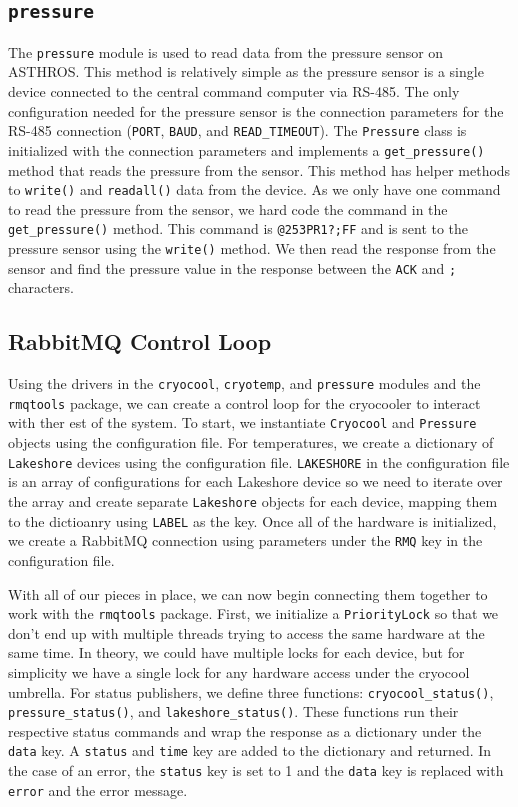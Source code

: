 \subsection{\texttt{pressure}}
The \texttt{pressure} module is used to read data from the pressure sensor on ASTHROS.
This method is relatively simple as the pressure sensor is a single device connected to the central command computer via RS-485.
The only configuration needed for the pressure sensor is the connection parameters for the RS-485 connection (\texttt{PORT}, \texttt{BAUD}, and \texttt{READ\_TIMEOUT}).
The \texttt{Pressure} class is initialized with the connection parameters and implements a \texttt{get\_pressure()} method that reads the pressure from the sensor.
This method has helper methods to \texttt{write()} and \texttt{readall()} data from the device. 
As we only have one command to read the pressure from the sensor, we hard code the command in the \texttt{get\_pressure()} method.
This command is \texttt{@253PR1?;FF} and is sent to the pressure sensor using the \texttt{write()} method.
We then read the response from the sensor and find the pressure value in the response between the 
\texttt{ACK} and \texttt{;} characters.

\subsection{RabbitMQ Control Loop}
Using the drivers in the \texttt{cryocool}, \texttt{cryotemp}, and \texttt{pressure} modules and the \texttt{rmqtools} package, we can create a control loop for the cryocooler to interact with ther est of the system.
To start, we instantiate \texttt{Cryocool} and \texttt{Pressure} objects using the configuration file.
For temperatures, we create a dictionary of \texttt{Lakeshore} devices using the configuration file. 
\texttt{LAKESHORE} in the configuration file is an array of configurations for each Lakeshore device so we need to iterate over the array and create separate \texttt{Lakeshore} objects for each device, mapping them to the dictioanry using \texttt{LABEL} as the key.
Once all of the hardware is initialized, we create a RabbitMQ connection using parameters under the \texttt{RMQ} key in the configuration file. 

With all of our pieces in place, we can now begin connecting them together to work with the \texttt{rmqtools} package.
First, we initialize a \texttt{PriorityLock} so that we don't end up with multiple threads trying to access the same hardware at the same time.
In theory, we could have multiple locks for each device, but for simplicity we have a single lock for any hardware access under the cryocool umbrella. 
For status publishers, we define three functions: \texttt{cryocool\_status()}, \texttt{pressure\_status()}, and \texttt{lakeshore\_status()}.
These functions run their respective status commands and wrap the response as a dictionary under the \texttt{data} key.
A \texttt{status} and \texttt{time} key are added to the dictionary and returned.
In the case of an error, the \texttt{status} key is set to 1 and the \texttt{data} key is replaced with \texttt{error} and the error message.

